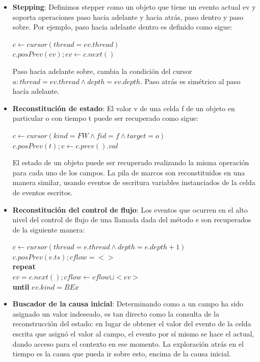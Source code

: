 \documentclass[12pt,legalpaper]{report}
\begin{document}
\begin{itemize}
	\item \textbf{Stepping}: Definimos stepper como un objeto que tiene un evento actual ev y soporta operaciones paso hacia adelante y hacia atrás, paso dentro y paso sobre.  Por ejemplo, paso hacia adelante dentro es definido como sigue:

	$c \leftarrow cursor(thread = ev.thread)$\\
	$c.posPrev(ev); ev \leftarrow c.next()$

Paso hacia adelante sobre, cambia la condición del cursor $a: thread = ev.thread \wedge depth = ev.depth$.  Paso atrás es simétrico al paso hacía adelante.

	\item \textbf{Reconstitución de estado}: El valor v de una celda f de un objeto en particular o con tiempo t puede ser recuperado como sigue:

	$c \leftarrow cursor(kind = FW  \wedge fid = f \wedge target = o)$\\
	$c.posPrev(t); v \leftarrow c.prev().val$

El estado de un objeto puede ser recuperado realizando la misma operación para cada uno de los campos.  La pila de marcos son reconstituidos en una manera similar, usando eventos de escritura variables instanciados de la celda de eventos escritos.

	\item \textbf{Reconstitución del control de flujo}: Los eventos que ocurren en el alto nivel del control de flujo de una llamada dada del método e  son recuperados de la siguiente manera:

	$c \leftarrow cursor(thread = e.thread  \wedge depth = e.depth + 1)$\\
	$c.posPrev(e.ts); cflow = <>$\\
	\textbf{repeat}\\
	$ev = c.next(); cflow \leftarrow cflow  \sqcup <ev>$\\
	\textbf{until} $ev.kind = BEx$\\

	\item \textbf{Buscador de la causa inicial}: Determinando como a un campo ha sido asignado un valor indeseado, es tan directo como la consulta de la reconstrucción del estado:  en lugar de obtener el valor del evento de la celda escrita que asignó el valor al campo, el evento por sí mismo se hace el actual, dando acceso para el contexto en ese momento.  La exploración atrás en el tiempo es la causa que pueda ir sobre esto, encima de la causa inicial.
	
\end{itemize}
\end{document}
